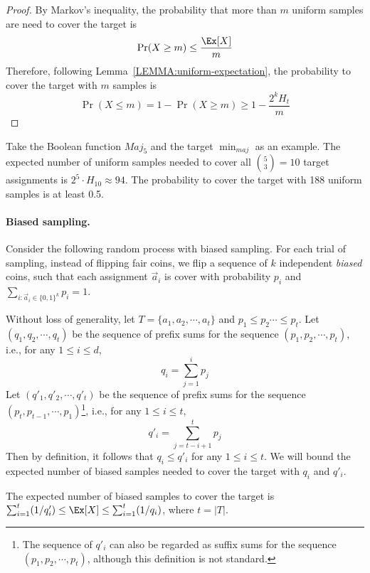 \begin{proof}
By Markov's inequality, the probability that more than $m$ uniform
samples are need to cover the target is
\[
  \Pr(X \ge m) \le \frac{\Ex[X]}{m}
\]
Therefore, following Lemma~\ref{LEMMA:uniform-expectation}, the probability to cover the target with $m$ samples is
\[
  \Pr(X \le m) = 1 - \Pr(X \ge m) \ge 1 - \frac{2^k H_t}{m}
\]
\end{proof}

Take the Boolean function $Maj_5$ and the target $\min_{maj}$ as an
example. The expected number of uniform samples needed to cover all
$\binom{5}{3} = 10$ target assignments is $2^5 \cdot H_{10} \approx 94$.
The probability to cover the target with 188 uniform samples is at least
0.5.

\paragraph{Biased sampling.}
Consider the following random process with biased sampling. For each
trial of sampling, instead of flipping fair coins, we flip a sequence of
$k$ independent \emph{biased} coins, such that each assignment
$\vec{a}_i$ is cover with probability $p_i$ and $\sum_{i: \vec{a}_i \in
\{0,1\}^k} p_i = 1$.

Without loss of generality, let $T = \{a_1, a_2, \cdots, a_t\}$ and $p_1 \le p_2 \cdots \le p_t$. Let $(q_1, q_2, \cdots, q_t)$ be the sequence of prefix sums for the sequence $(p_1, p_2, \cdots, p_t)$, i.e., for any $1\le i\le d$,
\[
  q_i = \sum_{j=1}^{i} p_j
\]
Let $(q'_1, q'_2, \cdots, q'_t)$ be the sequence of prefix sums for the
sequence $(p_t, p_{t-1}, \cdots, p_1)$\footnote{The sequence of $q'_i$
can also be regarded as suffix sums for the sequence $(p_1, p_2, \cdots,
p_t)$, although this definition is not standard.}, i.e., for any $1\le
i\le t$,
\[
  q'_i = \sum_{j=t-i+1}^{t} p_j
\]
Then by definition, it follows that $q_i \le q'_i$ for any $1\le i\le
t$. We will bound the expected number of biased samples needed to cover
the target with $q_i$ and $q'_i$.

\begin{lemma}
\label{LEMMA:biased-expectation}
The expected number of biased samples to cover the target is $\sum_{i=1}^t (1/q'_i) \le \Ex[X] \le \sum_{i=1}^t (1/q_i)$, where $t = |T|$.
\end{lemma}


